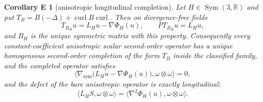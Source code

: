 \documentclass[11pt]{article}
\theoremstyle{definition}
\theoremstyle{remark}
\theoremstyle{plain}
\newtheorem*{corE}{Corollary E}
\DeclareMathOperator{\curl}{curl}
\DeclareMathOperator{\Sym}{Sym}
\newcommand{\R}{\mathbb{R}}
\newcommand{\gsym}{\nabla_{\mathrm{sym}}}
\begin{document}
\begin{corE}[anisotropic longitudinal completion]
\label{cor:E}
Let $H\in\Sym(3,\R)$ and put $T_{B}=B(-\Delta)+\curl B\curl$. Then on
divergence-free fields
\begin{equation}
\label{eq:bridge}
T_{B_{H}}u=L_{H}u-\nabla\Phi_{H}(u),
\qquad
PT_{B_{H}}u=L_{H}u ,
\end{equation}
and $B_{H}$ is the unique symmetric matrix with this property. Consequently
every constant-coefficient anisotropic scalar second-order operator has a
unique homogeneous second-order completion of the form $T_{B}$ inside the
classified family, and the completed operator
satisfies
\begin{equation}
\label{eq:completed}
\bigl\langle
\gsym\bigl(L_{H}u-\nabla\Phi_{H}(u)\bigr),\omega\otimes\omega
\bigr\rangle=0 ,
\end{equation}
and the defect of the bare anisotropic operator is exactly longitudinal:
\begin{equation}
\label{eq:defect}
\langle L_{H}S,\omega\otimes\omega\rangle
=\langle\nabla^{2}\Phi_{H}(u),\omega\otimes\omega\rangle .
\end{equation}
\end{corE}
\end{document}
